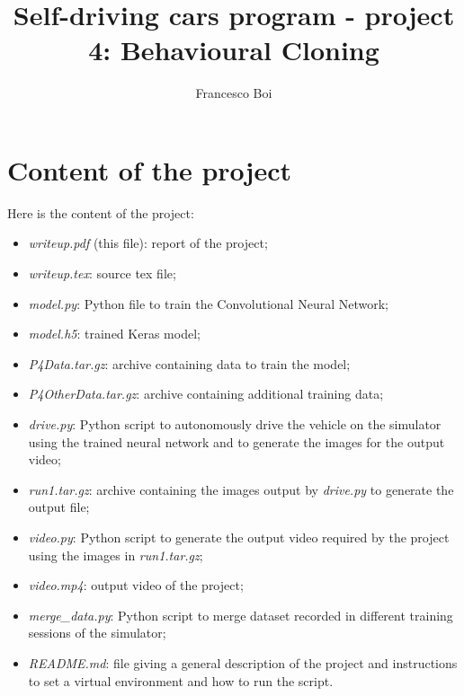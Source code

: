\documentclass{article}
\author{Francesco Boi}
\title{Self-driving cars program - project  4: Behavioural Cloning}
\date{}
\begin{document}

\maketitle
\tableofcontents 

\lstset{escapechar=ç,style=customc}
\section{Content of the project}
Here is the content of the project:
\begin{itemize}
\item \textit{writeup.pdf} (this file): report of the project;
\item \textit{writeup.tex}: source tex file;
\item \textit{model.py}: Python file to train the Convolutional Neural Network;
\item \textit{model.h5}: trained Keras model;
\item \textit{P4Data.tar.gz}: archive containing data to train the model;
\item \textit{P4OtherData.tar.gz}: archive containing additional training data;
\item \textit{drive.py}: Python script to autonomously drive the vehicle on the simulator using the trained neural network and to generate the images for the output video;
\item \textit{run1.tar.gz}: archive containing the images output by \textit{drive.py} to generate the output file;
\item \textit{video.py}: Python script to generate the output video required by the project using the images in \textit{run1.tar.gz};
\item \textit{video.mp4}: output video of the project;
\item \textit{merge\_data.py}: Python script to merge dataset recorded in different training sessions of the simulator;
\item \textit{README.md}: file giving a general description of the project and instructions to set a virtual environment and how to run the script.
\end{itemize}
\end{document}
